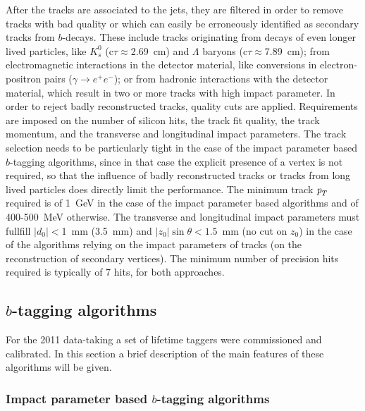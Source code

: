 After the tracks are associated to the jets, they are filtered in order to remove tracks with bad quality or which can easily be erroneously identified as secondary tracks from $b$-decays. These include tracks originating from decays of even longer lived particles, like $K^0_s$ (c$\tau \approx$2.69~cm) and $\Lambda$ baryons (c$\tau \approx$7.89~cm); from electromagnetic interactions in the detector material, like conversions in electron-positron pairs ($\gamma \rightarrow e^+ e^-$); or from hadronic interactions with the detector material, which result in two or more tracks with high impact parameter. 
In order to reject badly reconstructed tracks, quality cuts are applied. Requirements are imposed on the number of silicon hits, the track fit quality,  the track momentum, and the transverse and longitudinal impact parameters. The track selection needs to be particularly tight in the case of the impact parameter based $b$-tagging algorithms, since in that case the explicit presence of a vertex is not required, so that the influence of badly reconstructed tracks or tracks from long lived particles does directly limit the performance. The minimum track ${\emph{p}_{T}}$ required is of 1~GeV in the case of the impact parameter based algorithms and of 400-500~MeV otherwise. The transverse and longitudinal
impact parameters must fullfill  $|d_0|<$1~mm (3.5~mm) and $|z_0| \sin \theta < 1.5$~mm (no cut on $z_0$) in the case of the algorithms relying on the impact parameters of tracks (on the reconstruction of secondary vertices).  The minimum number of precision hits required is typically of 7 hits, for both approaches. 





\subsection{$b$-tagging algorithms}

For the 2011 data-taking a set of lifetime taggers were commissioned and calibrated. In this section a brief description of the main features of these algorithms will be given. 

\subsubsection{Impact parameter based $b$-tagging algorithms }


